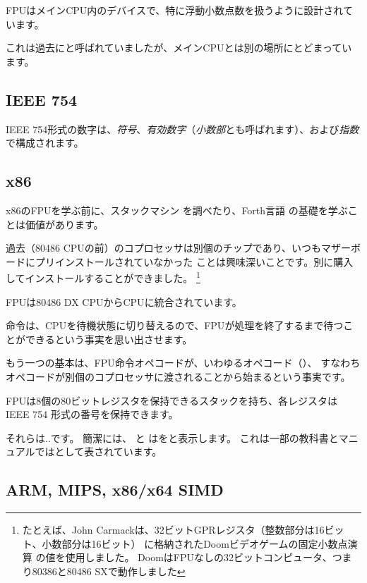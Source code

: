 ﻿\mysection{\FPUChapterName}
\label{sec:FPU}

\ac{FPU}はメイン\ac{CPU}内のデバイスで、特に浮動小数点数を扱うように設計されています。

これは過去にと呼ばれていましたが、メイン\ac{CPU}とは別の場所にとどまっています。

\subsection{IEEE 754}

IEEE 754形式の数字は、\emph{符号}、\emph{有効数字}（\emph{小数部}とも呼ばれます）、および\emph{指数}で構成されます。

\subsection{x86}

x86の\ac{FPU}を学ぶ前に、スタックマシン を調べたり、Forth言語 の基礎を学ぶことは価値があります。

過去（80486 CPUの前）のコプロセッサは別個のチップであり、いつもマザーボードにプリインストールされていなかった
ことは興味深いことです。別に購入してインストールすることができました。
\footnote{たとえば、John Carmackは、32ビット\ac{GPR}レジスタ（整数部分は16ビット、小数部分は16ビット）
に格納されたDoomビデオゲームの固定小数点演算
の値を使用しました。 DoomはFPUなしの32ビットコンピュータ、つまり80386と80486 SXで動作しました}

\ac{FPU}は80486 DX CPUから\ac{CPU}に統合されています。

命令は、\ac{CPU}を待機状態に切り替えるので、\ac{FPU}が処理を終了するまで待つことができるという事実を思い出させます。

もう一つの基本は、\ac{FPU}命令オペコードが、いわゆるオペコード（）、
すなわちオペコードが別個のコプロセッサに渡されることから始まるという事実です。

\label{FPU_is_stack}

FPUは8個の80ビットレジスタを保持できるスタックを持ち、各レジスタは
IEEE 754 形式の番号を保持できます。

それらは..です。 簡潔には、 \IDA と \olly はをと表示します。
これは一部の教科書とマニュアルではとして表されています。

\subsection{ARM, MIPS, x86/x64 SIMD}

